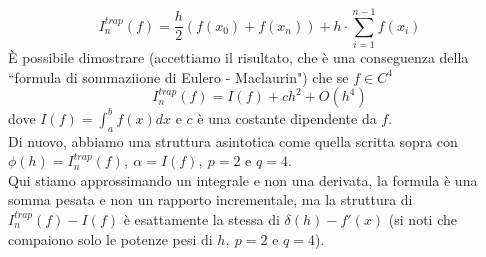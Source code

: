 \documentclass[12pt,a4paper]{article}
\begin{document}
\[
I_n^{trap} (f) = \frac{h}{2} (f(x_0) + f(x_n)) + h \cdot \sum_{i=1}^{n-1} f(x_i)
\]
È possibile dimostrare (accettiamo il risultato, che è una conseguenza della ``formula di sommaziione di Eulero - Maclaurin") che se $f \in C^4$
\[
I_n^{trap} (f) = I(f) + ch^2 + O(h^4)
\]
dove $I(f) = \int_a^b f(x) dx$ e $c$ è una costante dipendente da $f$.\\
Di nuovo, abbiamo una struttura asintotica come quella scritta sopra con $\phi (h) = I_n^{trap} (f), \ \alpha = I(f), \ p=2$ e $q=4$.\\
Qui stiamo approssimando un integrale e non una derivata, la formula è una somma pesata e non un rapporto incrementale, ma la struttura di $I_n^{trap} (f) - I(f)$ è esattamente la stessa di $\delta (h) - f'(x)$ (si noti che compaiono solo le potenze pesi di $h, \ p=2$ e $q=4$).
\end{document}
